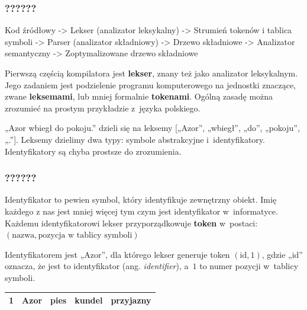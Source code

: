 \documentclass[10pt,t]{beamer}
\begin{document}
\begin{frame}
  \frametitle{??????}


  Kod źródłowy -> Lekser (analizator leksykalny) -> Strumień tokenów i
  tablica symboli -> Parser (analizator składniowy) -> Drzewo
  składniowe -> Analizator semantyczny -> Zoptymalizowane drzewo składniowe

  Pierwszą częścią kompilatora jest \textbf{lekser}, znany też jako
  analizator leksykalnym. Jego zadaniem jest podzielenie programu
  komputerowego na jednostki znaczące, zwane \textbf{leksemami}, lub
  mniej formalnie \textbf{tokenami}. Ogólną zasadę można zrozumieć na
  prostym przykładzie z~języka polskiego.

  „Azor wbiegł do pokoju.” dzieli się na leksemy [„Azor”, „wbiegł”, „do”,
  „pokoju”, „.”]. Leksemy dzielimy dwa typy: symbole abstrakcyjne
  i~identyfikatory. Identyfikatory są chyba prostsze do zrozumienia.

\end{frame}





\begin{frame}
  \frametitle{??????}


  Identyfikator to pewien symbol, który identyfikuje zewnętrzny obiekt.
  Imię każdego z nas jest mniej więcej tym czym jest identyfikator
  w~informatyce. Każdemu identyfikatorowi lekser przyporządkowuje
  \textbf{token} w~postaci: \\
  $( \text{nazwa}, \text{pozycja w tablicy symboli} )$

  Identyfikatorem jest „Azor”, dla którego lekser generuje token
  $( \text{id}, 1 )$, gdzie „id” oznacza, że jest to identyfikator (ang.
  \textit{identifier}), a~$1$ to numer pozycji w~tablicy symboli.

  \begin{center}

    \begin{tabular}{|c|c|c|c|c|}

      \hline
      1 & Azor & pies & kundel & przyjazny \\
      \hline
    \end{tabular}

  \end{center}

\end{frame}
\end{document}
